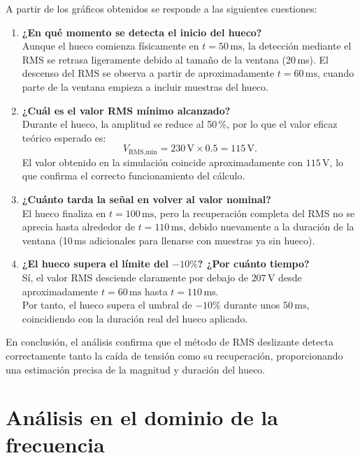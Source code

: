 \documentclass{article}
\begin{document}
A partir de los gráficos obtenidos se responde a las siguientes cuestiones:

\begin{enumerate}
    \item \textbf{¿En qué momento se detecta el inicio del hueco?} \\
    Aunque el hueco comienza físicamente en $t = 50\,\text{ms}$, la detección mediante el RMS se retrasa ligeramente debido al tamaño de la ventana (20\,ms). El descenso del RMS se observa a partir de aproximadamente $t = 60\,\text{ms}$, cuando parte de la ventana empieza a incluir muestras del hueco.

    \item \textbf{¿Cuál es el valor RMS mínimo alcanzado?} \\
    Durante el hueco, la amplitud se reduce al 50\,\%, por lo que el valor eficaz teórico esperado es:
    \[
        V_{\text{RMS,min}} = 230\,\text{V} \times 0.5 = 115\,\text{V}.
    \]
    El valor obtenido en la simulación coincide aproximadamente con $115\,\text{V}$, lo que confirma el correcto funcionamiento del cálculo.

    \item \textbf{¿Cuánto tarda la señal en volver al valor nominal?} \\
    El hueco finaliza en $t = 100\,\text{ms}$, pero la recuperación completa del RMS no se aprecia hasta alrededor de $t = 110\,\text{ms}$, debido nuevamente a la duración de la ventana (10\,ms adicionales para llenarse con muestras ya sin hueco).

    \item \textbf{¿El hueco supera el límite del $-10\%$? ¿Por cuánto tiempo?} \\
    Sí, el valor RMS desciende claramente por debajo de $207\,\text{V}$ desde aproximadamente $t = 60\,\text{ms}$ hasta $t = 110\,\text{ms}$. \\
    Por tanto, el hueco supera el umbral de $-10\%$ durante unos $50\,\text{ms}$, coincidiendo con la duración real del hueco aplicado.
\end{enumerate}

En conclusión, el análisis confirma que el método de RMS deslizante detecta correctamente tanto la caída de tensión como su recuperación, proporcionando una estimación precisa de la magnitud y duración del hueco.


\newpage
\section{Análisis en el dominio de la frecuencia}
\end{document}
